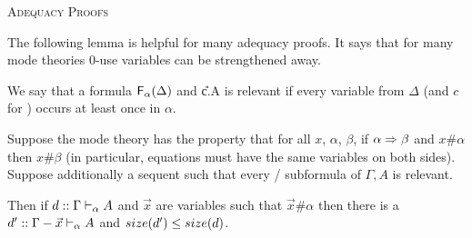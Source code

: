 
\begin{center}
 \textsc{Adequacy Proofs}
\end{center}
\label{sec:adequacy-long}

The following lemma is helpful for many adequacy proofs.  It says that
for many mode theories 0-use variables can be strengthened away.  

\begin{lemma} \label{lem:0-use-strengthening}
We say that a formula $\mathsf{F}_{\alpha}(\Delta)$ and \U{c.\alpha}{\Delta}{A}
is relevant if every variable from $\Delta$ (and $c$ for \Usymb) occurs
at least once in $\alpha$.

Suppose the mode theory has the property that for all $x$, $\alpha$,
$\beta$, if $\alpha \Rightarrow \beta$ and $x \# \alpha$ then $x \# \beta$ (in
particular, equations must have the same variables on both sides).
Suppose additionally a sequent  such that every
\Fsymb/\Usymb\/ subformula of $\Gamma,A$ is relevant.

Then if $d :: \Gamma \vdash_{\alpha} A$ and $\vec{x}$ are variables such
that $\vec{x} \# \alpha$ then there is a $d' ::
\Gamma-\vec{x} \vdash_{\alpha} A$ and $size(d') \le size(d)$.
\end{lemma}

